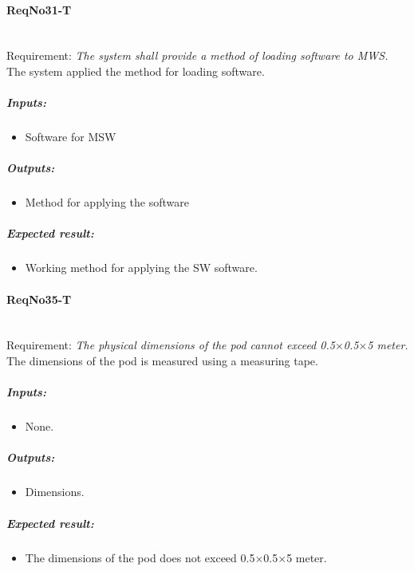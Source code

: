\paragraph{ReqNo31-T}\mbox{}\\ %
Requirement: \textit{The system shall provide a method of loading software to MWS.}\\
The system applied the method for loading software.
	\subparagraph{Inputs:}
	\begin{itemize}
	\item Software for MSW
	\end{itemize}
	\subparagraph{Outputs:}
	\begin{itemize}
	\item Method for applying the software
	\end{itemize}
	\subparagraph{Expected result:}
	\begin{itemize}
	\item Working method for applying the SW software.
	\end{itemize}
\paragraph{ReqNo35-T}\mbox{}\\ %
Requirement: \textit{The physical dimensions of the pod cannot exceed 0.5$\times$0.5$\times$5 meter.}
\\
The dimensions of the pod is measured using a measuring tape.

	\subparagraph{Inputs:}
	\begin{itemize}
	\item None.
	\end{itemize}
	\subparagraph{Outputs:}
	\begin{itemize}
	\item Dimensions.
	\end{itemize}
	\subparagraph{Expected result:}
	\begin{itemize}
	\item The dimensions of the pod does not exceed 0.5$\times$0.5$\times$5 meter.
	\end{itemize}


